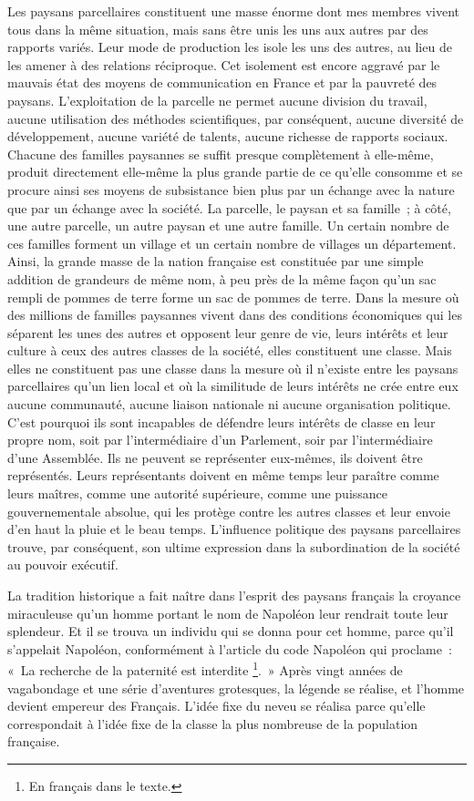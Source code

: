 \documentclass[french,twoside]{book} %
\begin{document}
Les paysans parcellaires constituent une masse énorme dont mes membres vivent tous dans la même situation, mais sans être unis les uns aux autres par des rapports variés. Leur mode de production les isole les uns des autres, au lieu de les amener à des relations réciproque. Cet isolement est encore aggravé par le mauvais état des moyens de communication en France et par la pauvreté des paysans. L’exploitation de la parcelle ne permet aucune division du travail, aucune utilisation des méthodes scientifiques, par conséquent, aucune diversité de développement, aucune variété de talents, aucune richesse de rapports sociaux. Chacune des familles paysannes se suffit presque complètement à elle-même, produit directement elle-même la plus grande partie de ce qu’elle consomme et se procure ainsi ses moyens de subsistance bien plus par un échange avec la nature que par un échange avec la société. La parcelle, le paysan et sa famille ; à côté, une autre parcelle, un autre paysan et une autre famille. Un certain nombre de ces familles forment un village et un certain nombre de villages un département. Ainsi, la grande masse de la nation française est constituée par une simple addition de grandeurs de même nom, à peu près de la même façon qu’un sac rempli de pommes de terre forme un sac de pommes de terre. Dans la mesure où des millions de familles paysannes vivent dans des conditions économiques qui les séparent les unes des autres et opposent leur genre de vie, leurs intérêts et leur culture à ceux des autres classes de la société, elles constituent une classe. Mais elles ne constituent pas une classe dans la mesure où il n’existe entre les paysans parcellaires qu’un lien local et où la similitude de leurs intérêts ne crée entre eux aucune communauté, aucune liaison nationale ni aucune organisation politique. C’est pourquoi ils sont incapables de défendre leurs intérêts de classe en leur propre nom, soit par l’intermédiaire d’un Parlement, soir par l’intermédiaire d’une Assemblée. Ils ne peuvent se représenter eux-mêmes, ils doivent être représentés. Leurs représentants doivent en même temps leur paraître comme leurs maîtres, comme une autorité supérieure, comme une puissance gouvernementale absolue, qui les protège contre les autres classes et leur envoie d’en haut la pluie et le beau temps. L’influence politique des paysans parcellaires trouve, par conséquent, son ultime expression dans la subordination de la société au pouvoir exécutif.\par
La tradition historique a fait naître dans l’esprit des paysans français la croyance miraculeuse qu’un homme portant le nom de Napoléon leur rendrait toute leur splendeur. Et il se trouva un individu qui se donna pour cet homme, parce qu’il s’appelait Napoléon, conformément à l’article du code Napoléon qui proclame : « La recherche de la paternité est interdite \footnote{En français dans le texte.}. » Après vingt années de vagabondage et une série d’aventures grotesques, la légende se réalise, et l’homme devient empereur des Français. L’idée fixe du neveu se réalisa parce qu’elle correspondait à l’idée fixe de la classe la plus nombreuse de la population française.\par
\end{document}
